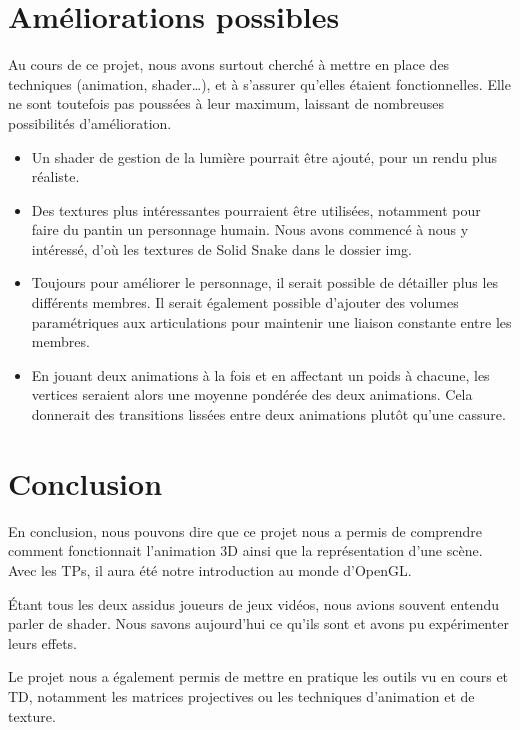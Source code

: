 \documentclass[10pt,a4paper,titlepage]{article}
\begin{document}
\section{Améliorations possibles}
Au cours de ce projet, nous avons surtout cherché à mettre en place des techniques (animation, shader\dots), et à s'assurer qu'elles étaient fonctionnelles. Elle ne sont toutefois pas poussées à leur maximum, laissant de nombreuses possibilités d'amélioration.
\begin{itemize}

\item Un shader de gestion de la lumière pourrait être ajouté, pour un rendu plus réaliste.

\item Des textures plus intéressantes pourraient être utilisées, notamment pour faire du pantin un personnage humain. Nous avons commencé à nous y intéressé, d'où les textures de Solid Snake dans le dossier img.

\item Toujours pour améliorer le personnage, il serait possible de détailler plus les différents membres. Il serait également possible d'ajouter des volumes paramétriques aux articulations pour maintenir une liaison constante entre les membres.

\item En jouant deux animations à la fois et en affectant un poids à chacune, les vertices seraient alors une moyenne pondérée des deux animations. Cela donnerait des transitions lissées entre deux animations plutôt qu'une cassure.

\end{itemize}
\section{Conclusion}
En conclusion, nous pouvons dire que ce projet nous a permis de comprendre comment fonctionnait l'animation 3D ainsi que la représentation d'une scène. Avec les TPs, il aura été notre introduction au monde d'OpenGL.
\par
\'Etant tous les deux assidus joueurs de jeux vidéos, nous avions souvent entendu parler de shader. Nous savons aujourd'hui ce qu'ils sont et avons pu expérimenter leurs effets. 

Le projet nous a également permis de mettre en pratique les outils vu en cours et TD, notamment les matrices projectives ou les techniques d'animation et de texture.
\end{document}
